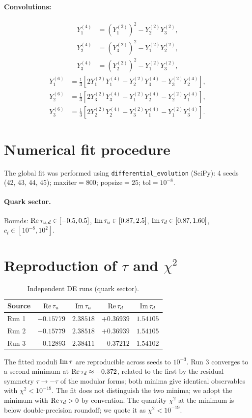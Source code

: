 \documentclass[12pt,a4paper]{article}
\numberwithin{equation}{section}
\begin{document}
\paragraph{Convolutions:}
\begin{align}
Y_1^{(4)} &= (Y_1^{(2)})^2 - Y_2^{(2)} Y_3^{(2)}, \\
Y_2^{(4)} &= (Y_3^{(2)})^2 - Y_1^{(2)} Y_2^{(2)}, \\
Y_3^{(4)} &= (Y_2^{(2)})^2 - Y_1^{(2)} Y_3^{(2)},
\end{align}
\begin{align}
Y_1^{(6)} &= \tfrac13\left[2 Y_1^{(2)} Y_1^{(4)} - Y_2^{(2)} Y_3^{(4)} - Y_3^{(2)} Y_2^{(4)}\right], \\
Y_2^{(6)} &= \tfrac13\left[2 Y_3^{(2)} Y_3^{(4)} - Y_1^{(2)} Y_2^{(4)} - Y_2^{(2)} Y_1^{(4)}\right], \\
Y_3^{(6)} &= \tfrac13\left[2 Y_2^{(2)} Y_2^{(4)} - Y_3^{(2)} Y_1^{(4)} - Y_1^{(2)} Y_3^{(4)}\right].
\end{align}

\section{Numerical fit procedure}
The global fit was performed using \texttt{differential\_evolution} (SciPy): 4 seeds (42, 43, 44, 45); maxiter\(=800\); popsize\(=25\); tol\(=10^{-8}\).
\paragraph{Quark sector.} Bounds: \({\rm Re}\,\tau_{u,d}\in[-0.5,0.5]\), \({\rm Im}\,\tau_u\in[0.87,2.5]\), \({\rm Im}\,\tau_d\in[0.87,1.60]\), \(c_i\in[10^{-8},10^2]\).

\section{Reproduction of \(\tau\) and \(\chi^2\)}
\begin{table}[H]
\centering
\caption{Independent DE runs (quark sector).}
\begin{tabular}{lcccc}
\toprule
Source & \({\rm Re}\,\tau_u\) & \({\rm Im}\,\tau_u\) & \({\rm Re}\,\tau_d\) & \({\rm Im}\,\tau_d\) \\
\midrule
Run 1 & \(-0.15779\) & \(2.38518\) & \(+0.36939\) & \(1.54105\) \\
Run 2 & \(-0.15779\) & \(2.38518\) & \(+0.36939\) & \(1.54105\) \\
Run 3 & \(-0.12893\) & \(2.38411\) & \(-0.37212\) & \(1.54102\) \\
\bottomrule
\end{tabular}
\end{table}
The fitted moduli \({\rm Im}\,\tau\) are reproducible across seeds to \(10^{-3}\). Run 3 converges to a second minimum at \({\rm Re}\,\tau_d \approx -0.372\), related to the first by the residual symmetry \(\tau \to -\tau\) of the modular forms; both minima give identical observables with \(\chi^2 < 10^{-19}\). The fit does not distinguish the two minima; we adopt the minimum with \({\rm Re}\,\tau_d > 0\) by convention. The quantity \(\chi^2\) at the minimum is below double-precision roundoff; we quote it as \(\chi^2<10^{-19}\).
\end{document}
